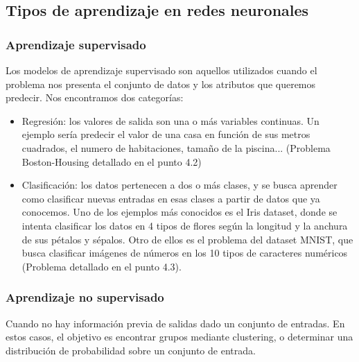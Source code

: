 \subsection{Tipos de aprendizaje en redes neuronales}
\subsubsection {Aprendizaje supervisado}
Los modelos de aprendizaje supervisado son aquellos utilizados cuando el problema nos presenta el conjunto de datos y los atributos que queremos predecir. Nos encontramos dos categorías:
\begin{itemize}
\item Regresión: los valores de salida son una o más variables continuas. Un ejemplo sería predecir el valor de una casa en función de sus metros cuadrados, el numero de habitaciones, tamaño de la piscina... (Problema Boston-Housing detallado en el punto 4.2)
\item Clasificación: los datos pertenecen a dos o más clases, y se busca aprender como clasificar nuevas entradas en esas clases a partir de datos que ya conocemos. Uno de los ejemplos más conocidos es el Iris dataset, donde se intenta clasificar los datos en 4 tipos de flores según la longitud y la anchura de sus pétalos y sépalos. Otro de ellos es el problema del dataset MNIST, que busca clasificar imágenes de números en los 10 tipos de caracteres numéricos (Problema detallado en el punto 4.3).
\end{itemize}
\subsubsection {Aprendizaje no supervisado}
Cuando no hay información previa de salidas dado un conjunto de entradas. En estos casos, el objetivo es encontrar grupos mediante clustering, o determinar una distribución de probabilidad sobre un conjunto de entrada.


